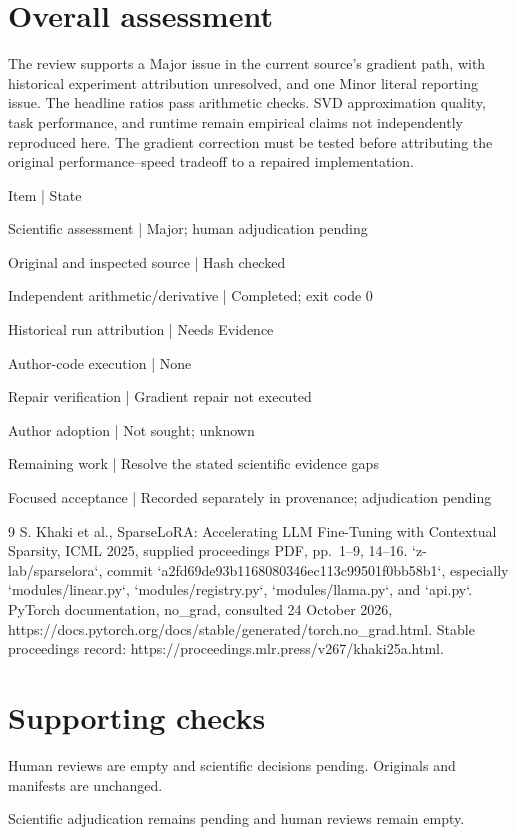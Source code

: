 \documentclass[10pt]{article}
\begin{document}
\section*{Overall assessment}
The review supports a Major issue in the current source’s gradient path, with historical experiment attribution unresolved, and one Minor literal reporting issue. The headline ratios pass arithmetic checks. SVD approximation quality, task performance, and runtime remain empirical claims not independently reproduced here. The gradient correction must be tested before attributing the original performance–speed tradeoff to a repaired implementation.\par
Item | State\par
Scientific assessment | Major; human adjudication pending\par
Original and inspected source | Hash checked\par
Independent arithmetic/derivative | Completed; exit code 0\par
Historical run attribution | Needs Evidence\par
Author-code execution | None\par
Repair verification | Gradient repair not executed\par
Author adoption | Not sought; unknown\par
Remaining work | Resolve the stated scientific evidence gaps\par
Focused acceptance | Recorded separately in provenance; adjudication pending\par
9 S. Khaki et al., SparseLoRA: Accelerating LLM Fine-Tuning with Contextual Sparsity, ICML 2025, supplied proceedings PDF, pp. 1–9, 14–16. `z-lab/sparselora`, commit `a2fd69de93b1168080346ec113c99501f0bb58b1`, especially `modules/linear.py`, `modules/registry.py`, `modules/llama.py`, and `api.py`. PyTorch documentation, no\_grad, consulted 24 October 2026, https://docs.pytorch.org/docs/stable/generated/torch.no\_grad.html. Stable proceedings record: https://proceedings.mlr.press/v267/khaki25a.html.\par
\section*{Supporting checks}
Human reviews are empty and scientific decisions pending. Originals and manifests are unchanged.\par
Scientific adjudication remains pending and human reviews remain empty.\par
\end{document}
